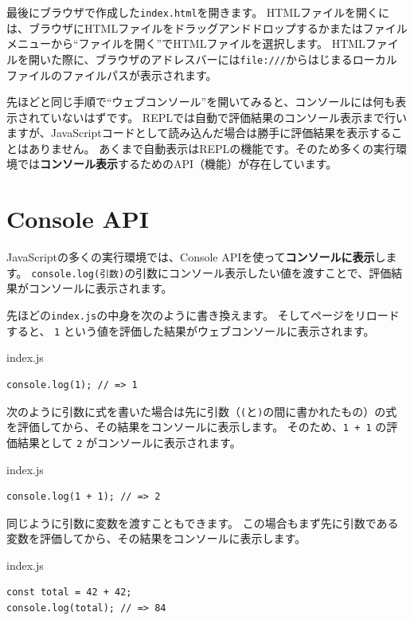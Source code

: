 最後にブラウザで作成した\texttt{index.html}を開きます。
HTMLファイルを開くには、ブラウザにHTMLファイルをドラッグアンドドロップするかまたはファイルメニューから``ファイルを開く''でHTMLファイルを選択します。
HTMLファイルを開いた際に、ブラウザのアドレスバーには\texttt{file:///}からはじまるローカルファイルのファイルパスが表示されます。

先ほどと同じ手順で``ウェブコンソール''を開いてみると、コンソールには何も表示されていないはずです。
REPLでは自動で評価結果のコンソール表示まで行いますが、JavaScriptコードとして読み込んだ場合は勝手に評価結果を表示することはありません。
あくまで自動表示はREPLの機能です。そのため多くの実行環境では\textbf{コンソール表示}するためのAPI（機能）が存在しています。

\hypertarget{console-api}{%
\section{Console API}\label{console-api}}

JavaScriptの多くの実行環境では、Console
APIを使って\textbf{コンソールに表示}します。
\texttt{console.log(引数)}の引数にコンソール表示したい値を渡すことで、評価結果がコンソールに表示されます。

先ほどの\texttt{index.js}の中身を次のように書き換えます。
そしてページをリロードすると、 \texttt{1}
という値を評価した結果がウェブコンソールに表示されます。

\begin{listtitle}
index.js
\end{listtitle}
\begin{lstlisting}
console.log(1); // => 1
\end{lstlisting}
\listend

次のように引数に式を書いた場合は先に引数（\texttt{(}と\texttt{)}の間に書かれたもの）の式を評価してから、その結果をコンソールに表示します。
そのため、\texttt{1 + 1} の評価結果として
\texttt{2} がコンソールに表示されます。

\begin{listtitle}
index.js
\end{listtitle}
\begin{lstlisting}
console.log(1 + 1); // => 2
\end{lstlisting}
\listend

同じように引数に変数を渡すこともできます。
この場合もまず先に引数である変数を評価してから、その結果をコンソールに表示します。

\begin{listtitle}
index.js
\end{listtitle}
\begin{lstlisting}
const total = 42 + 42;
console.log(total); // => 84
\end{lstlisting}
\listend

